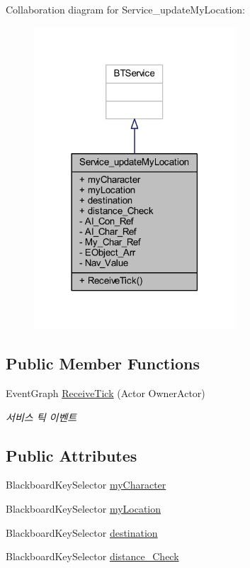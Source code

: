 Collaboration diagram for Service\+\_\+update\+My\+Location\+:
\nopagebreak
\begin{figure}[H]
\begin{center}
\leavevmode
\includegraphics[width=213pt]{class_service__update_my_location__coll__graph}
\end{center}
\end{figure}
\subsection*{Public Member Functions}
\begin{DoxyCompactItemize}
\item 
Event\+Graph \hyperlink{class_service__update_my_location_a2c2f90d92234520772c3a0108f148626}{Receive\+Tick} (Actor Owner\+Actor)
\begin{DoxyCompactList}\small\item\em 서비스 틱 이벤트 \end{DoxyCompactList}\end{DoxyCompactItemize}
\subsection*{Public Attributes}
\begin{DoxyCompactItemize}
\item 
Blackboard\+Key\+Selector \hyperlink{class_service__update_my_location_af65a492f86eb3082328f78c249981ac4}{my\+Character}
\item 
Blackboard\+Key\+Selector \hyperlink{class_service__update_my_location_acaa12f248f236e8068516533751daae4}{my\+Location}
\item 
Blackboard\+Key\+Selector \hyperlink{class_service__update_my_location_aeda83c71d6edf61186416547abacf575}{destination}
\item 
Blackboard\+Key\+Selector \hyperlink{class_service__update_my_location_a585e2ac19aed8fd8807fd9f0ef987825}{distance\+\_\+\+Check}
\end{DoxyCompactItemize}
